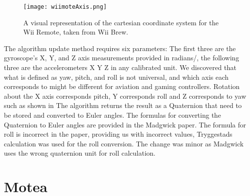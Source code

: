 \begin{figure}[h!]
  \centering
    \texttt{[image: wiimoteAxis.png]}
    \caption{\footnotesize A visual representation of the cartesian coordinate system for the Wii Remote, taken from Wii Brew\cite{wiiBrew}.}
\end{figure}


The algorithm update method requires six parameters: The first three are the gyroscope's X, Y, and Z axis measurements provided in radians/, the following three are the accelerometers X Y Z in any calibrated unit. We discovered that what is defined as yaw, pitch, and roll is not universal, and which axis each corresponds to might be different for aviation and gaming controllers. Rotation about the X axis corresponds pitch, Y corresponds roll and Z corresponds to yaw such as shown in %
The algorithm returns the result as a Quaternion that need to be stored and converted to Euler angles. The formulas for converting the Quaternion to Euler angles are provided in the Madgwick paper. The formula for roll is incorrect in the paper, providing us with incorrect values, Tryggestads calculation was used for the roll conversion. The change was minor as Madgwick uses the wrong quaternion unit for roll calculation.


\section{Motea}

